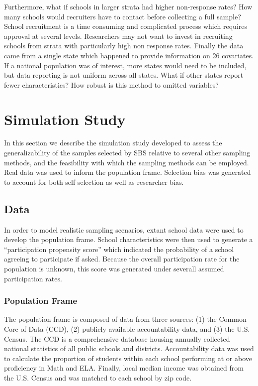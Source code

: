 \documentclass[man,floatsintext]{apa6}
\begin{document}
Furthermore, what if schools in larger strata had higher non-response rates? How many schools would recruiters have to contact before collecting a full sample? School recruitment is a time consuming and complicated process which requires approval at several levels. Researchers may not want to invest in recruiting schools from strata with particularly high non response rates. Finally the data came from a single state which happened to provide information on 26 covariates. If a national population was of interest, more states would need to be included, but data reporting is not uniform across all states. What if other states report fewer characteristics? How robust is this method to omitted variables?

\hypertarget{simulation-study}{%
\section{Simulation Study}\label{simulation-study}}

In this section we describe the simulation study developed to assess the generalizability of the samples selected by SBS relative to several other sampling methods, and the feasibility with which the sampling methods can be employed. Real data was used to inform the population frame.
Selection bias was generated to account for both self selection as well as researcher bias.

\hypertarget{data}{%
\subsection{Data}\label{data}}

In order to model realistic sampling scenarios, extant school data were used to develop the population frame. School characteristics were then used to generate a \enquote{participation propensity score} which indicated the probability of a school agreeing to participate if asked. Because the overall participation rate for the population is unknown, this score was generated under severall assumed participation rates.

\hypertarget{population-frame}{%
\subsubsection{Population Frame}\label{population-frame}}

The population frame is composed of data from three sources: (1) the Common Core of Data (CCD), (2) publicly available accountability data, and (3) the U.S. Census. The CCD is a comprehensive database housing annually collected national statistics of all public schools and districts. Accountability data was used to calculate the proportion of students within each school performing at or above proficiency in Math and ELA. Finally, local median income was obtained from the U.S. Census and was matched to each school by zip code.
\end{document}

